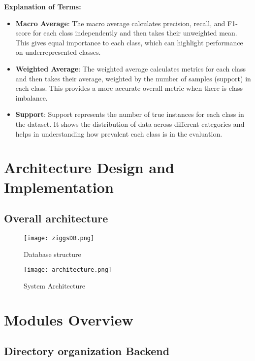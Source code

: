 \documentclass[conference]{IEEEtran}
\begin{document}
\noindent
\textbf{Explanation of Terms:}
\begin{itemize}
    \item \textbf{Macro Average}: The macro average calculates precision, recall, and F1-score for each class independently and then takes their unweighted mean. This gives equal importance to each class, which can highlight performance on underrepresented classes.
    \item \textbf{Weighted Average}: The weighted average calculates metrics for each class and then takes their average, weighted by the number of samples (support) in each class. This provides a more accurate overall metric when there is class imbalance.
    \item \textbf{Support}: Support represents the number of true instances for each class in the dataset. It shows the distribution of data across different categories and helps in understanding how prevalent each class is in the evaluation.    
\end{itemize}

\section{Architecture Design and Implementation}

\subsection{Overall architecture}
\begin{figure}[H]
    \centering
    \texttt{[image: ziggsDB.png]}
    \caption{Database structure}
    \label{fig:database}
\end{figure}


\begin{figure}[H]
    \centering
    \texttt{[image: architecture.png]}
    \caption{System Architecture}
    \label{fig:system_architecture}
\end{figure}

\section{Modules Overview}

\subsection{Directory organization Backend}
\end{document}

